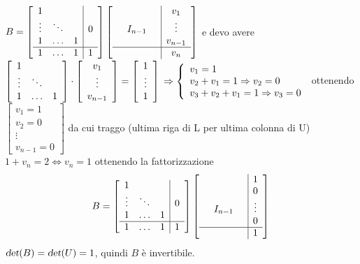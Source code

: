 \documentclass[10pt]{book}
\begin{document}
$B = \left[\begin{array}{c c c | c}
1 & & & \\
\vdots & \ddots & & 0 \\
1 & \ldots & 1 & \\
\hline
1 & \ldots & 1 & 1
\end{array} \right]\left[\begin{array}{c c c | c}
 & & & v_1\\
 & I_{n-1} & & \vdots \\
 &  &  & v_{n-1} \\
\hline
 & & & v_n
\end{array} \right]$ e devo avere $\left[\begin{array}{c c c}
1 & & \\
\vdots & \ddots &\\
1 & \ldots & 1
\end{array} \right]\cdot\left[\begin{array}{c}
v_1\\\vdots\\v_{n-1}
\end{array} \right] = \left[\begin{array}{c}
1\\\vdots\\1
\end{array} \right]\\\Rightarrow \left\{\begin{array}{l}
v_1 = 1\\
v_2 + v_1 = 1 \Rightarrow v_2 = 0\\
v_3 + v_2 + v_1 = 1 \Rightarrow v_3 = 0
\end{array} \right.$ ottenendo $\left[\begin{array}{c}
v_1 = 1\\v_2 = 0\\\vdots\\v_{n-1} = 0
\end{array} \right]$ da cui traggo (ultima riga di L per ultima colonna di U) $1 + v_n = 2 \Leftrightarrow v_n = 1$ ottenendo la fattorizzazione $$B = \left[\begin{array}{c c c | c}
1 & & & \\
\vdots & \ddots & & 0 \\
1 & \ldots & 1 & \\
\hline
1 & \ldots & 1 & 1
\end{array} \right]\left[\begin{array}{c c c | c}
 & & & 1\\
 & & & 0\\
 & I_{n-1} & & \vdots \\
 &  &  & 0 \\
\hline
 & & & 1
\end{array} \right]$$
$\textsl{det}(B) = \textsl{det}(U) = 1$, quindi $B$ è invertibile.
\end{document}
